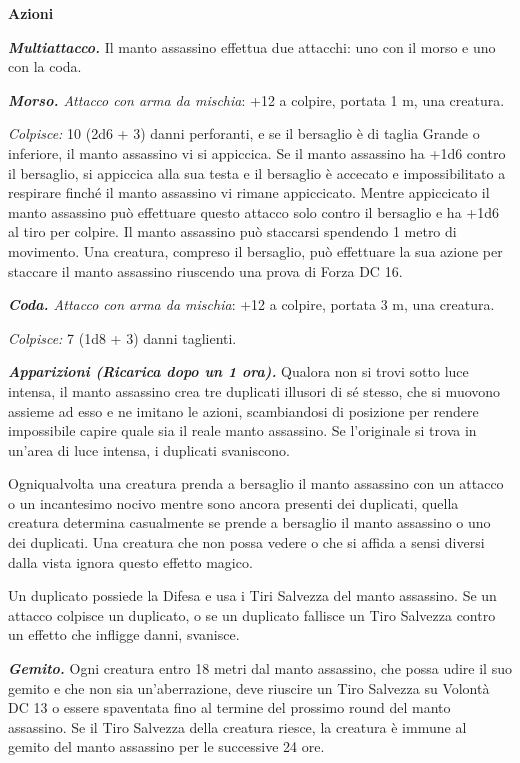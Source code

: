 \begin{multicols}{2}
\textbf{Azioni}

\textit{\textbf{Multiattacco.}} Il manto assassino effettua due attacchi:
uno con il morso e uno con la coda.

\textit{\textbf{Morso.} Attacco con arma da mischia}: +12 a colpire, portata 1 m, una creatura.

\textit{Colpisce:} 10 (2d6 + 3) danni perforanti, e se il bersaglio è di taglia Grande o inferiore, il manto assassino vi si appiccica. Se il manto assassino ha +1d6 contro il bersaglio, si appiccica alla sua testa e il bersaglio è accecato e impossibilitato a respirare finché il manto assassino vi rimane appiccicato. Mentre appiccicato il manto assassino può effettuare questo attacco solo  contro il bersaglio e ha +1d6 al tiro per colpire. Il manto  assassino può staccarsi spendendo 1 metro di movimento. Una  creatura, compreso il bersaglio, può effettuare la sua azione per  staccare il manto assassino riuscendo una prova di Forza DC 16.


\textit{\textbf{Coda.} Attacco con arma da mischia}: +12 a colpire, portata 3 m, una creatura.

\textit{Colpisce:} 7 (1d8 + 3) danni taglienti.

\textit{\textbf{Apparizioni (Ricarica dopo un 1 ora).}} Qualora non si trovi sotto luce intensa, il manto assassino crea tre duplicati illusori di sé stesso, che si muovono assieme ad esso e ne imitano le azioni, scambiandosi di posizione per rendere impossibile capire quale sia il reale manto assassino. Se l'originale si trova in un'area di luce intensa, i duplicati svaniscono.

Ogniqualvolta una creatura prenda a bersaglio il manto assassino con un attacco o un incantesimo nocivo mentre sono ancora presenti dei duplicati, quella creatura determina casualmente se prende a bersaglio il manto assassino o uno dei duplicati. Una creatura che non possa vedere o che si affida a sensi diversi dalla vista ignora questo effetto magico.

Un duplicato possiede la Difesa e usa i Tiri Salvezza del manto assassino. Se un attacco colpisce un duplicato, o se un duplicato fallisce un Tiro Salvezza contro un effetto che infligge danni, svanisce.

\textit{\textbf{Gemito.}} Ogni creatura entro 18 metri dal manto assassino, che possa udire il suo gemito e che non sia un'aberrazione, deve riuscire un Tiro Salvezza su Volontà DC 13 o essere spaventata fino al termine del prossimo round del manto assassino. Se il Tiro Salvezza della creatura
riesce, la creatura è immune al gemito del manto assassino per le successive 24 ore.


\end{multicols}
